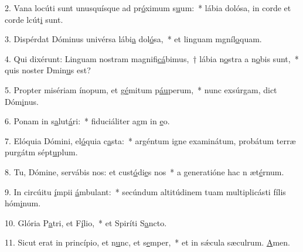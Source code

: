 2. Vana locúti sunt unusquísque ad pr\uline{ó}ximum s\uline{u}um:~* lábia dolósa, in corde et corde lcút\uline{i} sunt.\par 
3. Dispérdat Dóminus univérsa lábi\uline{a} dol\uline{ó}sa,~* et linguam mgníl\uline{o}quam.\par 
4. Qui dixérunt: Linguam nostram magnifi\uline{cá}bimus,~† lábia n\uline{o}stra a n\uline{o}bis sunt,~* quis noster Dmin\uline{u}s est?\par 
5. Propter misériam ínopum, et g\uline{é}mitum p\uline{áu}perum,~* nunc exsúrgam, dict Dóm\uline{i}nus.\par 
6. Ponam in s\uline{a}lut\uline{á}ri:~* fiduciáliter agm in \uline{e}o.\par 
7. Elóquia Dómini, el\uline{ó}quia c\uline{a}sta:~* argéntum igne examinátum, probátum terræ purgátm sépt\uline{u}plum.\par 
8. Tu, Dómine, servábis nos: et cust\uline{ó}di\uline{e}s nos~* a generatióne hac n æt\uline{é}rnum.\par 
9. In circúitu \uline{í}mpii \uline{á}mbulant:~* secúndum altitúdinem tuam multiplicásti fílis hóm\uline{i}num.\par 
10. Glória P\uline{a}tri, et F\uline{í}lio,~* et Spiríti S\uline{a}ncto.\par 
11. Sicut erat in princípio, et n\uline{u}nc, et s\uline{e}mper,~* et in sǽcula sæculrum. \uline{A}men.\par 
